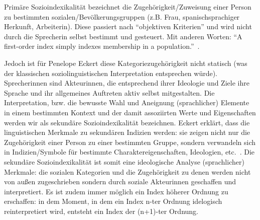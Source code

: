 Primäre Sozioindexikalität bezeichnet die Zugehörigkeit/Zuweisung einer Person zu bestimmten sozialen/Bevölkerungsgruppen (z.B. Frau, spanischsprachiger Herkunft, Arbeiterin). %
Diese passiert nach ``objektiven Kriterien'' und wird nicht durch die Sprecherin selbst bestimmt und gesteuert.
Mit anderen Worten: ``A first-order index simply indexes membership in a population.''~\cite{Eckert08}.%

Jedoch ist für Penelope Eckert diese Kategoriezugehörigkeit nicht statisch (was der klassischen soziolinguistischen Interpretation entsprechen würde). %
Sprecherinnen sind Akteurinnen, die entsprechend ihrer Ideologie und Ziele ihre Sprache und ihr allgemeines Auftreten aktiv selbst mitgestalten.
Die Interpretation, bzw. die bewusste Wahl und Aneignung (sprachlicher) Elemente in einem bestimmten Kontext und der damit assoziirten Werte und Eigenschaften werden wir als sekundäre Sozioindexikalität bezeichnen.
Eckert erklärt, dass die linguistischen Merkmale zu sekundären Indizien werden: sie zeigen nicht nur die Zugehörigkeit einer Person zu einer bestimmten Gruppe, sondern verwandeln sich in Indizien/Symbole für bestimmte Charaktereigenschaften, Ideologien, etc.~\cite{Eckert08}. %
Die sekundäre Sozioindexikalität ist somit eine ideologische Analyse (sprachlicher) Merkmale: die sozialen Kategorien und die Zugehörigkeit zu denen werden nicht von außen zugeschrieben sondern durch soziale Akteurinnen geschaffen und interpretiert.
Es ist zudem immer möglich ein Index höherer Ordnung zu erschaffen: in dem Moment, in dem ein Index n-ter Ordnung idelogisch reinterpretiert wird, entsteht ein Index der (n+1)-ter Ordnung.


